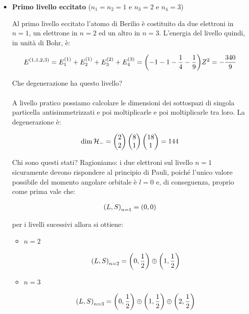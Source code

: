 \begin{itemize}
	\item \textbf{Primo livello eccitato} ($n_1 = n_2 = 1$ e $n _3 = 2$ e $n_4 = 3$)
	
		Al primo livello eccitato l'atomo di Berilio è costituito da due elettroni in $n = 1$, un elettrone in $n = 2$ ed un altro in $n = 3$. L'energia del livello quindi, in unità di Bohr, è:
		
	\begin{align*}
		E^{\qty(1, 1, 2, 3)} = E_1^{\qty(1)} + E_2^{\qty(1)} + E_3^{\qty(2)} + E_4^{\qty(3)} = \qty(-1-1-\frac{1}{4}-\frac{1}{9}) Z^2 = - \frac{340}{9}
	\end{align*}

		Che degenerazione ha questo livello?
		\\
		\\
		A livello pratico possiamo calcolare le dimensioni dei sottospazi di singola particella antisimmetrizzati e poi moltiplicarle e poi moltiplicarle tra loro. La degenerazione è:
	
	\begin{align*}
		\text{dim} \, \mathcal{H}_- = \mqty(2 \\ 2) \, \mqty( 8 \\ 1) \, \mqty(18 \\ 1) = 144
	\end{align*}

	Chi sono questi stati? Ragioniamo: i due elettroni sul livello $n = 1$ sicuramente devono rispondere al principio di Pauli, poiché l’unico valore possibile del momento angolare orbitale è $l = 0$ e, di conseguenza, proprio come prima vale che:
	
	\begin{align*}
		\qty(L, S)_{n = 1} = \qty(0, 0)
	\end{align*}
	
		per i livelli sucessivi allora si ottiene:
		
	\begin{itemize}
		\item $n = 2$
		
		\begin{align*}
			\qty(L, S)_{n = 2} = \qty(0, \frac{1}{2}) \oplus \qty(1, \frac{1}{2})
		\end{align*}

		\item $n = 3$
			
		\begin{align*}
			\qty(L, S)_{n = 3} = \qty(0, \frac{1}{2} ) \oplus \qty(1, \frac{1}{2} ) \oplus \qty(2, \frac{1}{2})
		\end{align*}
	\end{itemize}


\end{itemize}

